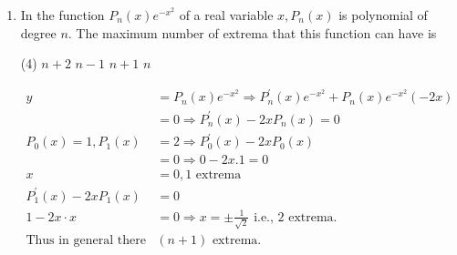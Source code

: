 \begin{enumerate}[label=\color{ocre}\textbf{\arabic*.}]
	{}
	\begin{tasks}(2)
		\task[\textbf{A.}] $\sum_{n, m=0}^{\infty} x^{n+m} P_{n}(1) P_{m}\left(\frac{1}{2}\right)$
		\task[\textbf{B.}] $\sum_{n, m=0}^{\infty} x^{n+m} P_{n}(1) P_{m}(1)$
		\task[\textbf{C.}] $\sum_{n, m=0}^{\infty} x^{n-m} P_{n}(1) P_{m}(1)$
		\task[\textbf{D.}] $\sum_{n, m=0}^{\infty} x^{n-m} P_{n}(0) P_{m}(1)$
	\end{tasks}
	\begin{answer}
		\begin{align*}
		G(t, x)&=\frac{1}{\sqrt{1-2 x t+x^{2}}}=\sum_{n=0}^{\infty} x^{n} P_{n}(t)\text{ for }|x|<1\\
		G(1, x)&=\frac{1}{\sqrt{1-2 x+x^{2}}}=\sum_{n=0}^{\infty} x^{n} P_{n}(1)\\
		&=\frac{1}{\sqrt{(1-x)^{2}}}=\sum_{n=0}^{\infty} x^{n} P_{n}(1)\\&=\frac{1}{1-x}\text{ Since } |x|<1\\
		\text{Now, }x \cdot \frac{1}{1-x}&=\int_{0}^{x} f\left(x^{\prime}\right) d x^{\prime}
		\intertext{Differentiating both sides,}
		f(x)&=\frac{d}{d x} \frac{x}{1-x}=\frac{1}{(1-x)^{2}}
		\end{align*}
		So the correct answer is \textbf{Option (B)}
	\end{answer}
	\item In the function $P_{n}(x) e^{-x^{2}}$ of a real variable $x, P_{n}(x)$ is polynomial of degree $n$. The maximum number of extrema that this function can have is
	{}
	\begin{tasks}(4)
		\task[\textbf{A.}] $n+2$
		\task[\textbf{B.}]  $n-1$
		\task[\textbf{C.}] $n+1$
		\task[\textbf{D.}] $n$
	\end{tasks}
	\begin{answer}
		\begin{align*}
		y&=P_{n}(x) e^{-x^{2}} \Rightarrow P_{n}^{\prime}(x) e^{-x^{2}}+P_{n}(x) e^{-x^{2}}(-2 x)\\
		&=0 \Rightarrow P_{n}^{\prime}(x)-2 x P_{n}(x)=0\\
		P_{0}(x)=1, P_{1}(x)&=2 \Rightarrow P_{0}^{\prime}(x)-2 x P_{0}(x)\\&=0 \Rightarrow 0-2 x .1=0\\
		x&=0,1\text{ extrema}\\
		P_{1}^{\prime}(x)-2 x P_{1}(x)&=0\\
		1-2 x \cdot x&=0 \Rightarrow x=\pm \frac{1}{\sqrt{2}}\text{ i.e., 2 extrema.}\\
		\text{Thus in general there are }&(n+1)\text{ extrema.}

\end{align*}
\end{answer}
\end{enumerate}
